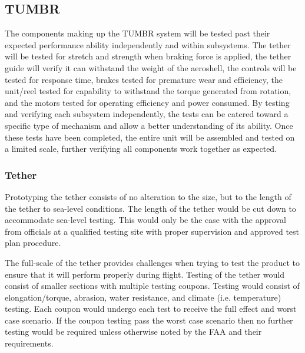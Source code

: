 
\subsection{TUMBR}

\indent\indent The components making up the TUMBR system will be tested past their expected performance ability independently and within subsystems. The tether will be tested for stretch and strength when braking force is applied, the tether guide will verify it can withstand the weight of the aeroshell, the controls will be tested for response time, brakes tested for premature wear and efficiency, the unit/reel tested for capability to withstand the torque generated from rotation, and the motors tested for operating efficiency and power consumed. By testing and verifying each subsystem independently, the tests can be catered toward a specific type of mechanism and allow a better understanding of its ability. Once these tests have been completed, the entire unit will be assembled and tested on a limited scale, further verifying all components work together as expected.


\subsubsection{Tether}

\indent\indent Prototyping the tether consists of no alteration to the size, but to the length of the tether to sea-level conditions. The length of the tether would be cut down to accommodate sea-level testing. This would only be the case with the approval from officials at a qualified testing site with proper supervision and approved test plan procedure.

\indent\indent The full-scale of the tether provides challenges when trying to test the product to ensure that it will perform properly during flight. Testing of the tether would consist of smaller sections with multiple testing coupons. Testing would consist of elongation/torque, abrasion, water resistance, and climate (i.e. temperature) testing. Each coupon would undergo each test to receive the full effect and worst case scenario. If the coupon testing pass the worst case scenario then no further testing would be required unless otherwise noted by the FAA and their requirements.


